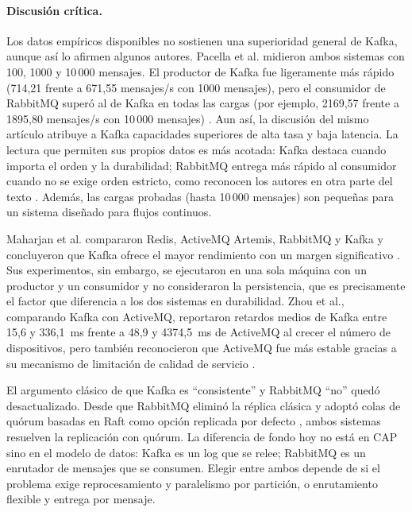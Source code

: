 \documentclass[11pt,a4paper]{article}
\begin{document}
\paragraph{Discusión crítica.}
Los datos empíricos disponibles no sostienen una superioridad general de Kafka, aunque así lo afirmen algunos autores. Pacella et al. midieron ambos sistemas con 100, 1000 y 10\,000 mensajes. El productor de Kafka fue ligeramente más rápido (714,21 frente a 671,55 mensajes/s con 1000 mensajes), pero el consumidor de RabbitMQ superó al de Kafka en todas las cargas (por ejemplo, 2169,57 frente a 1895,80 mensajes/s con 10\,000 mensajes) \cite{pacella2025scalable}. Aun así, la discusión del mismo artículo atribuye a Kafka capacidades superiores de alta tasa y baja latencia. La lectura que permiten sus propios datos es más acotada: Kafka destaca cuando importa el orden y la durabilidad; RabbitMQ entrega más rápido al consumidor cuando no se exige orden estricto, como reconocen los autores en otra parte del texto \cite{pacella2025scalable}. Además, las cargas probadas (hasta 10\,000 mensajes) son pequeñas para un sistema diseñado para flujos continuos.

Maharjan et al. compararon Redis, ActiveMQ Artemis, RabbitMQ y Kafka y concluyeron que Kafka ofrece el mayor rendimiento con un margen significativo \cite{maharjan2023benchmarking}. Sus experimentos, sin embargo, se ejecutaron en una sola máquina con un productor y un consumidor y no consideraron la persistencia, que es precisamente el factor que diferencia a los dos sistemas en durabilidad. Zhou et al., comparando Kafka con ActiveMQ, reportaron retardos medios de Kafka entre 15,6 y 336,1~ms frente a 48,9 y 4374,5~ms de ActiveMQ al crecer el número de dispositivos, pero también reconocieron que ActiveMQ fue más estable gracias a su mecanismo de limitación de calidad de servicio \cite{zhou2024distributed}.

El argumento clásico de que Kafka es \enquote{consistente} y RabbitMQ \enquote{no} quedó desactualizado. Desde que RabbitMQ eliminó la réplica clásica y adoptó colas de quórum basadas en Raft como opción replicada por defecto \cite{rabbitmqquorum}, ambos sistemas resuelven la replicación con quórum. La diferencia de fondo hoy no está en CAP sino en el modelo de datos: Kafka es un log que se relee; RabbitMQ es un enrutador de mensajes que se consumen. Elegir entre ambos depende de si el problema exige reprocesamiento y paralelismo por partición, o enrutamiento flexible y entrega por mensaje.

\end{document}
